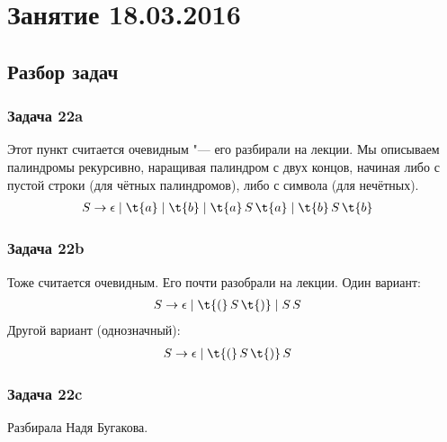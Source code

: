 \chapter{Занятие 18.03.2016}
\section{Разбор задач}

\subsection{Задача 22a}
	Этот пункт считается очевидным "--- его разбирали на лекции.
	Мы описываем палиндромы рекурсивно, наращивая палиндром с двух концов, начиная либо с пустой
	строки (для чётных палиндромов), либо с символа (для нечётных).
	\begin{align*}
		S &\to \epsilon \mid \t{a} \mid \t{b} \mid \t{a}\,S\,\t{a} \mid \t{b}\,S\,\t{b}
	\end{align*}

\subsection{Задача 22b}
	Тоже считается очевидным.
	Его почти разобрали на лекции.
	Один вариант:
	\begin{align*}
		S &\to \epsilon \mid \t{(}\,S\,\t{)} \mid S\,S
	\end{align*}
	Другой вариант (однозначный):
	\begin{align*}
		S &\to \epsilon \mid \t{(}\,S\,\t{)}\,S
	\end{align*}

\subsection{Задача 22c}
	Разбирала Надя Бугакова.

